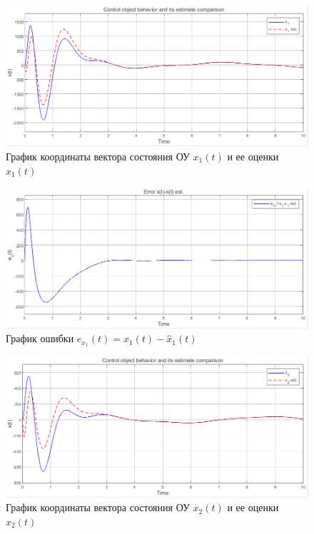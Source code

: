 \documentclass[a4paper, 12pt]{article}
\begin{document}
    \begin{figure}[H]
        \centering
        \includegraphics[scale=0.6]{2task_xhx1.png}
        \captionsetup{skip=0pt}
        \caption{График координаты вектора состояния ОУ $x_{1}(t)$ и ее оценки $\hat{x}_{1}(t)$}
        \label{fig:2task_xhx1}
    \end{figure}
    \begin{figure}[H]
        \centering
        \includegraphics[scale=0.6]{2task_ex1.png}
        \captionsetup{skip=0pt}
        \caption{График ошибки $e_{x_1}(t)=x_{1}(t)-\hat{x}_{1}(t)$}
        \label{fig:2task_ex1}
    \end{figure}
    \begin{figure}[H]
        \centering
        \includegraphics[scale=0.6]{2task_xhx2.png}
        \captionsetup{skip=0pt}
        \caption{График координаты вектора состояния ОУ $x_{2}(t)$ и ее оценки $\hat{x}_{2}(t)$}
        \label{fig:2task_xhx2}
    \end{figure}
\end{document}
